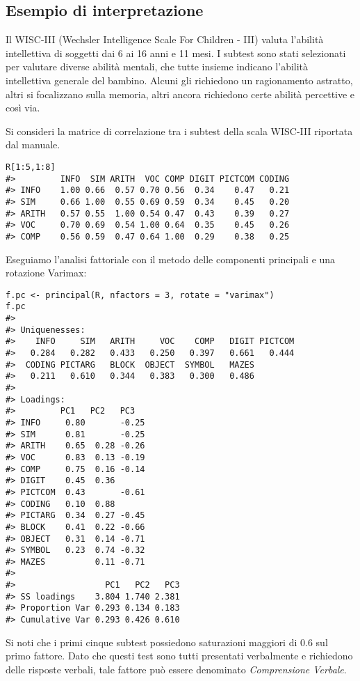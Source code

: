 \subsection{Esempio di interpretazione }

 Il WISC-III (Wechsler Intelligence Scale For Children - III) valuta l'abilità intellettiva di soggetti dai 6 ai 16 anni e 11 mesi.  I subtest sono stati selezionati per valutare diverse abilità mentali, che tutte insieme indicano l'abilità intellettiva generale del bambino. Alcuni gli richiedono un ragionamento astratto, altri si focalizzano sulla memoria, altri ancora richiedono certe abilità percettive e così via. 

Si consideri la matrice di correlazione  tra i subtest della scala
WISC-III riportata dal manuale. 

\begin{lstlisting}
R[1:5,1:8]
#>         INFO  SIM ARITH  VOC COMP DIGIT PICTCOM CODING
#> INFO    1.00 0.66  0.57 0.70 0.56  0.34    0.47   0.21
#> SIM     0.66 1.00  0.55 0.69 0.59  0.34    0.45   0.20
#> ARITH   0.57 0.55  1.00 0.54 0.47  0.43    0.39   0.27
#> VOC     0.70 0.69  0.54 1.00 0.64  0.35    0.45   0.26
#> COMP    0.56 0.59  0.47 0.64 1.00  0.29    0.38   0.25
\end{lstlisting}

\noindent
Eseguiamo l'analisi fattoriale con il metodo delle componenti principali e una rotazione Varimax:

\begin{lstlisting}
f.pc <- principal(R, nfactors = 3, rotate = "varimax")
f.pc
#> 
#> Uniquenesses:
#>    INFO     SIM   ARITH     VOC    COMP   DIGIT PICTCOM 
#>   0.284   0.282   0.433   0.250   0.397   0.661   0.444 
#>  CODING PICTARG   BLOCK  OBJECT  SYMBOL   MAZES 
#>   0.211   0.610   0.344   0.383   0.300   0.486 
#> 
#> Loadings:
#>         PC1   PC2   PC3  
#> INFO     0.80       -0.25
#> SIM      0.81       -0.25
#> ARITH    0.65  0.28 -0.26
#> VOC      0.83  0.13 -0.19
#> COMP     0.75  0.16 -0.14
#> DIGIT    0.45  0.36      
#> PICTCOM  0.43       -0.61
#> CODING   0.10  0.88      
#> PICTARG  0.34  0.27 -0.45
#> BLOCK    0.41  0.22 -0.66
#> OBJECT   0.31  0.14 -0.71
#> SYMBOL   0.23  0.74 -0.32
#> MAZES          0.11 -0.71
#> 
#>                  PC1   PC2   PC3
#> SS loadings    3.804 1.740 2.381
#> Proportion Var 0.293 0.134 0.183
#> Cumulative Var 0.293 0.426 0.610
\end{lstlisting}

\noindent
Si noti che i primi cinque subtest possiedono saturazioni maggiori di
$0.6$ sul primo fattore. Dato che questi test sono tutti presentati
verbalmente e richiedono delle risposte verbali, tale fattore può
essere denominato \textit{Comprensione Verbale}.

